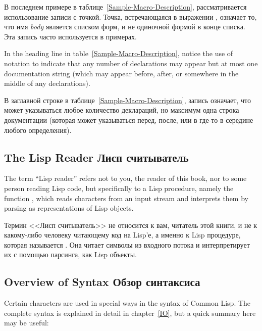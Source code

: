 В последнем примере в таблице~\ref{Sample-Macro-Description}, рассматривается
использование записи с точкой. Точка, встречающаяся в выражении
, означает то, что имя {\it body}
является списком форм, и не одиночной формой в конце списка. Эта запись 
часто используется в примерах.

\begin{newer}
In the heading line in table~\ref{Sample-Macro-Description}, notice the
use of \Mchoice{~} notation to indicate that any number of declarations
may appear but at most one documentation string (which may appear before,
after, or somewhere in the middle of any declarations).

В заглавной строке в таблице~\ref{Sample-Macro-Description}, запись \Mchoice{~}
означает, что может указываться любое количество деклараций, 
но максимум одна строка документации (которая может указываться перед, после,
или в где-то в середине любого определения).
\end{newer}

\subsection{The Lisp Reader Лисп считыватель}

The term ``Lisp reader'' refers not to you, the reader of this book,
nor to some person reading Lisp code, but specifically
to a Lisp procedure, namely the function ,
which reads characters from an input stream and interprets them by parsing
as representations of Lisp objects.

Термин <<Лисп считыватель>> не относится к вам, читатель этой книги, и не к
какому-либо человеку читающему код на Lisp'е, а именно к Lisp процедуре, которая
называется . Она читает символы из входного потока и интерпретирует их
с помощью парсинга, как Lisp объекты.

\subsection{Overview of Syntax Обзор синтаксиса}

Certain characters are used in special ways in the syntax of Common Lisp.
The complete syntax is explained in detail in chapter~\ref{IO},
but a quick summary here may be useful:


